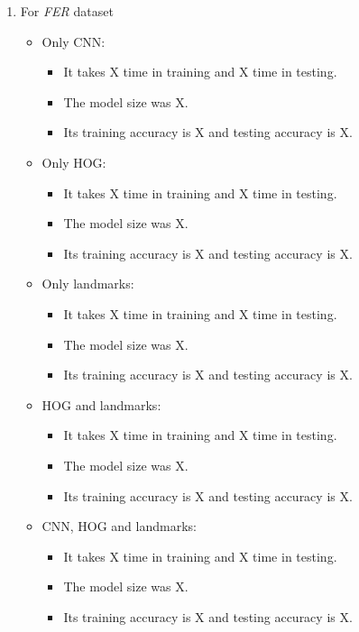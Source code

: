 \documentclass{article}
\begin{document}
\begin{enumerate}
\item For \textit{FER} dataset \newline
\begin{itemize}
    \item Only CNN: 
        \begin{itemize}
            \item It takes X time in training and X time in testing.
            \item The model size was X.
            \item Its training accuracy is X and testing accuracy is X.
        \end{itemize}
    \item Only HOG: 
        \begin{itemize}
            \item It takes X time in training and X time in testing.
            \item The model size was X.
            \item Its training accuracy is X and testing accuracy is X.
        \end{itemize}
    \item Only landmarks: 
        \begin{itemize}
            \item It takes X time in training and X time in testing.
            \item The model size was X.
            \item Its training accuracy is X and testing accuracy is X.
        \end{itemize}
    \item HOG and landmarks: 
        \begin{itemize}
            \item It takes X time in training and X time in testing.
            \item The model size was X.
            \item Its training accuracy is X and testing accuracy is X.
        \end{itemize}
    \item CNN, HOG and landmarks: 
        \begin{itemize}
            \item It takes X time in training and X time in testing.
            \item The model size was X.
            \item Its training accuracy is X and testing accuracy is X.

\end{itemize}
\end{itemize}
\end{enumerate}
\end{document}
